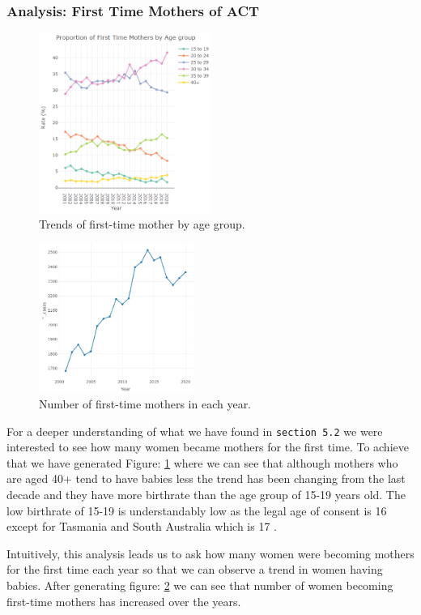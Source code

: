 \subsubsection{Analysis: First Time Mothers of ACT}

\begin{figure}
  \centering
  \includegraphics[width=0.5\textwidth]{subsections/age_mothers/first_time_age_group.png}
  \caption{Trends of first-time mother by age group.}
  \label{fig:age2}
\end{figure}

\begin{figure}
  \centering
  \includegraphics[width=0.45\textwidth]{subsections/age_mothers/first_time.png}
  \caption{Number of first-time mothers in each year.}
  \label{fig:firstTime}
\end{figure}
For a deeper understanding of what we have found in \verb|section 5.2| we were interested to see how many women became mothers for the first time. To achieve that we have generated Figure: \ref{fig:age2} where we can see that although mothers who are aged 40+ tend to have babies less the trend has been changing from the last decade and they have more birthrate than the age group of 15-19 years old. The low birthrate of 15-19 is understandably low as the legal age of consent is 16 except for Tasmania and South Australia which is 17 \cite{consentWebsite}.

Intuitively, this analysis leads us to ask how many women were becoming mothers for the first time each year so that we can observe a trend in women having babies. After generating figure: \ref{fig:firstTime} we can see that number of women becoming first-time mothers has increased over the years.
